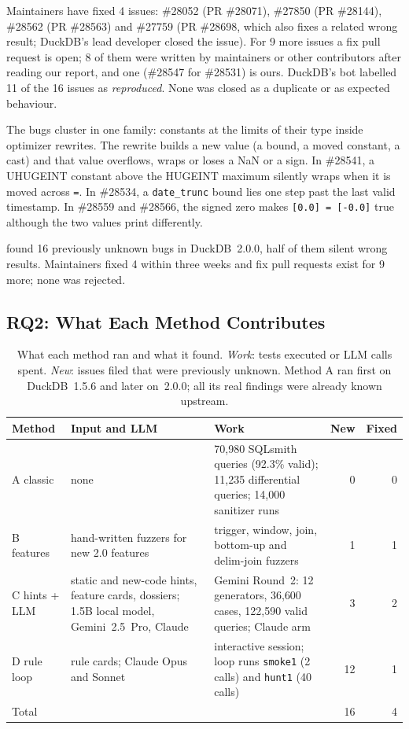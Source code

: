 Maintainers have fixed 4 issues: \#28052 (PR \#28071), \#27850 (PR \#28144), \#28562 (PR \#28563) and \#27759
(PR \#28698, which also fixes a related wrong result; DuckDB's lead developer closed the issue). For 9
more issues a fix pull request is open; 8 of them were written by maintainers or other contributors after reading our
report, and one (\#28547 for \#28531) is ours. DuckDB's bot labelled 11 of the 16 issues as \emph{reproduced}. None was
closed as a duplicate or as expected behaviour.

The bugs cluster in one family: constants at the limits of their type inside optimizer rewrites. The rewrite builds a
new value (a bound, a moved constant, a cast) and that value overflows, wraps or loses a NaN or a sign. In \#28541, a UHUGEINT constant above the HUGEINT maximum silently wraps when it is moved across \texttt{=}. In \#28534, a \texttt{date\_trunc} bound lies one step past the last valid timestamp. In \#28559 and \#28566, the signed zero makes \texttt{[0.0] = [-0.0]} true although the two values print differently.

\begin{observation}
\tool found 16 previously unknown bugs in DuckDB~2.0.0, half of them silent wrong results. Maintainers fixed 4 within three weeks and fix pull requests exist for 9 more; none was rejected.
\end{observation}

\subsection{RQ2: What Each Method Contributes}
\label{sec:eval-methods}

\begin{table}[t]
\caption{What each method ran and what it found. \emph{Work}: tests executed or LLM calls spent. \emph{New}: issues
filed that were previously unknown. Method A ran first on DuckDB~1.5.6 and later on~2.0.0; all its real findings were
already known upstream.}
\label{tab:methods}
\footnotesize\centering
\begin{tabular}{lp{4.4cm}p{4.6cm}rr}
\toprule
Method & Input and LLM & Work & New & Fixed \\
\midrule
A classic & none & 70{,}980 SQLsmith queries (92.3\% valid); 11{,}235 differential queries; 14{,}000 sanitizer runs & 0 & 0 \\
B features & hand-written fuzzers for new 2.0 features & trigger, window, join, bottom-up and delim-join fuzzers & 1 & 1 \\
C hints + LLM & static and new-code hints, feature cards, dossiers; 1.5B local model, Gemini~2.5~Pro, Claude &
  Gemini Round~2: 12 generators, 36{,}600 cases, 122{,}590 valid queries; Claude arm & 3 & 2 \\
D rule loop & rule cards; Claude Opus and Sonnet & interactive session; loop runs \texttt{smoke1} (2 calls) and
  \texttt{hunt1} (40 calls) & 12 & 1 \\
\midrule
Total & & & 16 & 4 \\
\bottomrule
\end{tabular}
\end{table}


